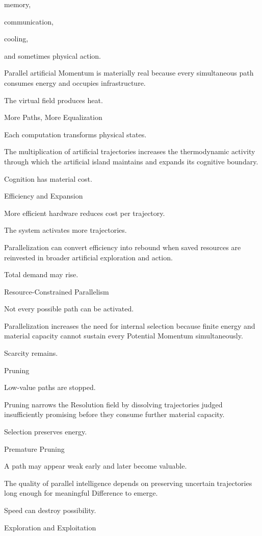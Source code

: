 memory,

communication,

cooling,

and sometimes physical action.

Parallel artificial Momentum is materially real because every simultaneous path consumes energy and occupies infrastructure.

The virtual field produces heat.

More Paths, More Equalization

Each computation transforms physical states.

The multiplication of artificial trajectories increases the thermodynamic activity through which the artificial island maintains and expands its cognitive boundary.

Cognition has material cost.

Efficiency and Expansion

More efficient hardware reduces cost per trajectory.

The system activates more trajectories.

Parallelization can convert efficiency into rebound when saved resources are reinvested in broader artificial exploration and action.

Total demand may rise.

Resource-Constrained Parallelism

Not every possible path can be activated.

Parallelization increases the need for internal selection because finite energy and material capacity cannot sustain every Potential Momentum simultaneously.

Scarcity remains.

Pruning

Low-value paths are stopped.

Pruning narrows the Resolution field by dissolving trajectories judged insufficiently promising before they consume further material capacity.

Selection preserves energy.

Premature Pruning

A path may appear weak early and later become valuable.

The quality of parallel intelligence depends on preserving uncertain trajectories long enough for meaningful Difference to emerge.

Speed can destroy possibility.

Exploration and Exploitation

